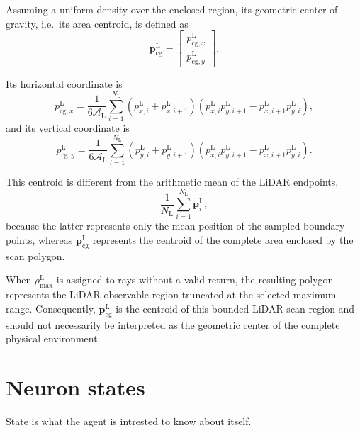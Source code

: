 \documentclass[a4paper]{article}
\begin{document}
         Assuming a uniform density over the enclosed region, its geometric center of gravity, i.e.\ its area centroid, is defined as
         \[
         \mathbf{p}_{\mathrm{cg}}^{\mathrm{L}}
         =
         \begin{bmatrix}
            p_{\mathrm{cg},x}^{\mathrm{L}}\\
            p_{\mathrm{cg},y}^{\mathrm{L}}
         \end{bmatrix}.
         \]

         Its horizontal coordinate is
         \[
         p_{\mathrm{cg},x}^{\mathrm{L}}
         =
         \frac{1}{6\mathcal{A}_{\mathrm{L}}}
         \sum_{i=1}^{N_{\mathrm{L}}}
         \left(
         p_{x,i}^{\mathrm{L}}
         +
         p_{x,i+1}^{\mathrm{L}}
         \right)
         \left(
         p_{x,i}^{\mathrm{L}}p_{y,i+1}^{\mathrm{L}}
         -
         p_{x,i+1}^{\mathrm{L}}p_{y,i}^{\mathrm{L}}
         \right),
         \]
         and its vertical coordinate is
         \[
         p_{\mathrm{cg},y}^{\mathrm{L}}
         =
         \frac{1}{6\mathcal{A}_{\mathrm{L}}}
         \sum_{i=1}^{N_{\mathrm{L}}}
         \left(
         p_{y,i}^{\mathrm{L}}
         +
         p_{y,i+1}^{\mathrm{L}}
         \right)
         \left(
         p_{x,i}^{\mathrm{L}}p_{y,i+1}^{\mathrm{L}}
         -
         p_{x,i+1}^{\mathrm{L}}p_{y,i}^{\mathrm{L}}
         \right).
         \]

         This centroid is different from the arithmetic mean of the LiDAR endpoints,
         \[
         \frac{1}{N_{\mathrm{L}}}
         \sum_{i=1}^{N_{\mathrm{L}}}
         \mathbf{p}_i^{\mathrm{L}},
         \]
         because the latter represents only the mean position of the sampled boundary points, whereas
         \(\mathbf{p}_{\mathrm{cg}}^{\mathrm{L}}\) represents the centroid of the complete area enclosed by the scan polygon.

         When \(\rho_{\max}^{\mathrm{L}}\) is assigned to rays without a valid return, the resulting polygon represents the LiDAR-observable region truncated at the selected maximum range. Consequently,
         \(\mathbf{p}_{\mathrm{cg}}^{\mathrm{L}}\) is the centroid of this bounded LiDAR scan region and should not necessarily be interpreted as the geometric center of the complete physical environment.
         
         
                  
         \section{Neuron states}
         State is what the agent is  intrested to know about itself. 
         
\end{document}
